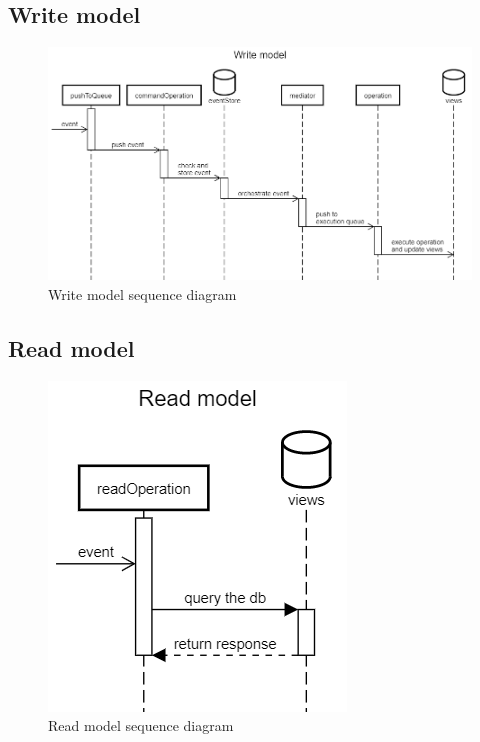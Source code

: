 \subsection{Write model}
\begin{figure} [H]
	\includegraphics[scale=0.5]{../Img/write_model}
	\caption{Write model sequence diagram}\label{}
\end{figure}

\subsection{Read model}
\begin{figure} [H]
	\centering
	\includegraphics[scale=0.55]{../Img/read_model}
	\caption{Read model sequence diagram}\label{}
\end{figure}
